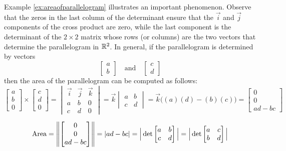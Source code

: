 \documentclass{ximera}
\begin{document}
Example \ref{ex:areaofparallelogram} illustrates an important phenomenon.  Observe that the zeros in the last column of the determinant ensure that the $\vec{i}$ and $\vec{j}$ components of the cross product are zero, while the last component is the determinant of the $2\times 2$ matrix whose rows (or columns) are the two vectors that determine the parallelogram in $\mathbb{R}^2$.  In general, if the parallelogram is determined by vectors 
$$\begin{bmatrix}a\\b\end{bmatrix}\quad\text{and}\quad\begin{bmatrix}c\\d\end{bmatrix}$$
then the area of the parallelogram can be computed as follows:
$$\begin{bmatrix}a\\b\\0\end{bmatrix}\times\begin{bmatrix}c\\d\\0\end{bmatrix}=\begin{vmatrix}\vec{i}&\vec{j}&\vec{k}\\a&b&0\\c&d&0\end{vmatrix}=\vec{k}\begin{vmatrix}a&b\\c&d\end{vmatrix}=\vec{k}\Big((a)(d)-(b)(c)\Big)=\begin{bmatrix}0\\0\\ad-bc\end{bmatrix}$$

$$\mbox{Area}=\left\lVert\begin{bmatrix}0\\0\\ad-bc\end{bmatrix}\right\rVert=|ad-bc|=\Big|\det\begin{bmatrix}a&b\\c&d\end{bmatrix}\Big|=\Big|\det\begin{bmatrix}a&c\\b&d\end{bmatrix}\Big|$$
\end{document}
